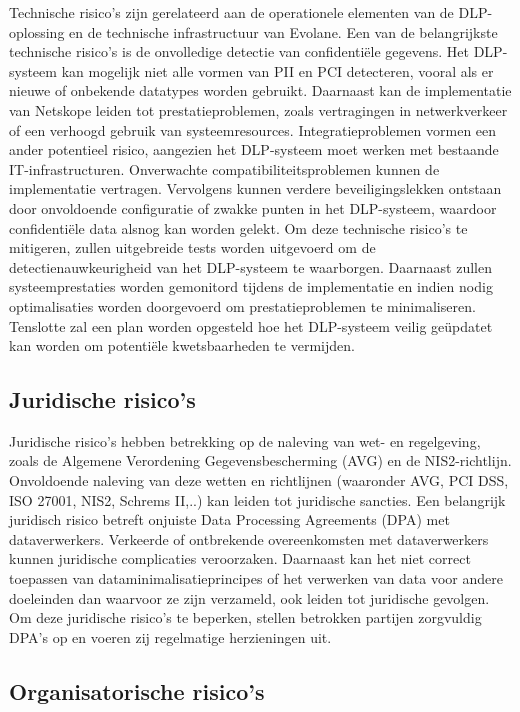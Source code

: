 Technische risico's zijn gerelateerd aan de operationele elementen van de DLP-oplossing en de technische infrastructuur van Evolane.
Een van de belangrijkste technische risico's is de onvolledige detectie van confidentiële gegevens. 
Het DLP-systeem kan mogelijk niet alle vormen van PII en PCI detecteren, vooral als er nieuwe of onbekende datatypes worden gebruikt.
Daarnaast kan de implementatie van Netskope leiden tot prestatieproblemen, zoals vertragingen in netwerkverkeer of een verhoogd gebruik van systeemresources.
Integratieproblemen vormen een ander potentieel risico, aangezien het DLP-systeem moet werken met bestaande IT-infrastructuren.
Onverwachte compatibiliteitsproblemen kunnen de implementatie vertragen. Vervolgens kunnen verdere beveiligingslekken ontstaan 
door onvoldoende configuratie of zwakke punten in het DLP-systeem, waardoor confidentiële data alsnog kan worden gelekt.
Om deze technische risico's te mitigeren, zullen uitgebreide tests worden uitgevoerd om de detectienauwkeurigheid van het DLP-systeem te waarborgen.
Daarnaast zullen systeemprestaties worden gemonitord tijdens de implementatie en indien nodig optimalisaties worden doorgevoerd om prestatieproblemen te minimaliseren.
Tenslotte zal een plan worden opgesteld hoe het DLP-systeem veilig geüpdatet kan worden om potentiële kwetsbaarheden te vermijden.

\subsection{Juridische risico's}

Juridische risico's hebben betrekking op de naleving van wet- en regelgeving, zoals de Algemene Verordening Gegevensbescherming (AVG) en de NIS2-richtlijn.
Onvoldoende naleving van deze wetten en richtlijnen (waaronder AVG, PCI DSS, ISO 27001, NIS2, Schrems II,..) kan leiden tot juridische sancties. 
Een belangrijk juridisch risico betreft onjuiste Data Processing Agreements (DPA) met dataverwerkers. 
Verkeerde of ontbrekende overeenkomsten met dataverwerkers kunnen juridische complicaties veroorzaken. 
Daarnaast kan het niet correct toepassen van dataminimalisatieprincipes of het verwerken van data voor andere doeleinden dan waarvoor ze zijn verzameld, 
ook leiden tot juridische gevolgen. 
Om deze juridische risico's te beperken, stellen betrokken partijen zorgvuldig DPA's op en voeren zij regelmatige herzieningen uit.

\subsection{Organisatorische risico's}

